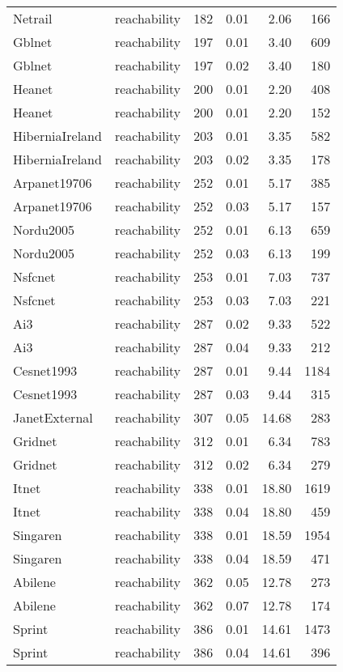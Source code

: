 \begin{tabular}{llrrrr}
Netrail & reachability & 182 & 0.01 & 2.06 & 166 \\
Gblnet & reachability & 197 & 0.01 & 3.40 & 609 \\
Gblnet & reachability & 197 & 0.02 & 3.40 & 180 \\
Heanet & reachability & 200 & 0.01 & 2.20 & 408 \\
Heanet & reachability & 200 & 0.01 & 2.20 & 152 \\
HiberniaIreland & reachability & 203 & 0.01 & 3.35 & 582 \\
HiberniaIreland & reachability & 203 & 0.02 & 3.35 & 178 \\
Arpanet19706 & reachability & 252 & 0.01 & 5.17 & 385 \\
Arpanet19706 & reachability & 252 & 0.03 & 5.17 & 157 \\
Nordu2005 & reachability & 252 & 0.01 & 6.13 & 659 \\
Nordu2005 & reachability & 252 & 0.03 & 6.13 & 199 \\
Nsfcnet & reachability & 253 & 0.01 & 7.03 & 737 \\
Nsfcnet & reachability & 253 & 0.03 & 7.03 & 221 \\
Ai3 & reachability & 287 & 0.02 & 9.33 & 522 \\
Ai3 & reachability & 287 & 0.04 & 9.33 & 212 \\
Cesnet1993 & reachability & 287 & 0.01 & 9.44 & 1184 \\
Cesnet1993 & reachability & 287 & 0.03 & 9.44 & 315 \\
JanetExternal & reachability & 307 & 0.05 & 14.68 & 283 \\
Gridnet & reachability & 312 & 0.01 & 6.34 & 783 \\
Gridnet & reachability & 312 & 0.02 & 6.34 & 279 \\
Itnet & reachability & 338 & 0.01 & 18.80 & 1619 \\
Itnet & reachability & 338 & 0.04 & 18.80 & 459 \\
Singaren & reachability & 338 & 0.01 & 18.59 & 1954 \\
Singaren & reachability & 338 & 0.04 & 18.59 & 471 \\
Abilene & reachability & 362 & 0.05 & 12.78 & 273 \\
Abilene & reachability & 362 & 0.07 & 12.78 & 174 \\
Sprint & reachability & 386 & 0.01 & 14.61 & 1473 \\
Sprint & reachability & 386 & 0.04 & 14.61 & 396 \\

\end{tabular}
